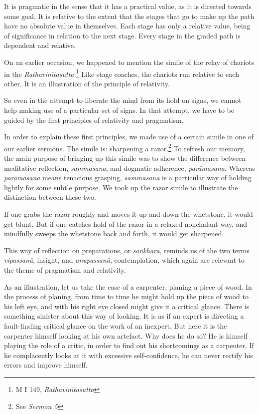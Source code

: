It is pragmatic in the sense that it has a practical value, as it is directed towards some goal. It is relative to the extent that the stages that go to make up the path have no absolute value in themselves. Each stage has only a relative value, being of significance in relation to the next stage. Every stage in the graded path is dependent and relative.

On an earlier occasion, we happened to mention the simile of the relay of chariots in the \emph{Rathavinītasutta.}\footnote{M I 149, \emph{Rathavinītasutta}} Like stage coaches, the chariots run relative to each other. It is an illustration of the principle of relativity.

So even in the attempt to liberate the mind from its hold on signs, we cannot help making use of a particular set of signs. In that attempt, we have to be guided by the first principles of relativity and pragmatism.

In order to explain these first principles, we made use of a certain simile in one of our earlier sermons. The simile is: sharpening a razor.\footnote{See \emph{Sermon 5}} To refresh our memory, the main purpose of bringing up this simile was to show the difference between meditative reflection, \emph{sammasana}, and dogmatic adherence, \emph{parāmasana}. Whereas \emph{parāmasana} means tenacious grasping, \emph{sammasana} is a particular way of holding lightly for some subtle purpose. We took up the razor simile to illustrate the distinction between these two.

If one grabs the razor roughly and moves it up and down the whetstone, it would get blunt. But if one catches hold of the razor in a relaxed nonchalant way, and mindfully sweeps the whetstone back and forth, it would get sharpened.

This way of reflection on preparations, or \emph{saṅkhārā}, reminds us of the two terms \emph{vipassanā}, insight, and \emph{anupassanā}, contemplation, which again are relevant to the theme of pragmatism and relativity.

As an illustration, let us take the case of a carpenter, planing a piece of wood. In the process of planing, from time to time he might hold up the piece of wood to his left eye, and with his right eye closed might give it a critical glance. There is something sinister about this way of looking. It is as if an expert is directing a fault-finding critical glance on the work of an inexpert. But here it is the carpenter himself looking at his own artefact. Why does he do so? He is himself playing the role of a critic, in order to find out his shortcomings as a carpenter. If he complacently looks at it with excessive self-confidence, he can never rectify his errors and improve himself.

